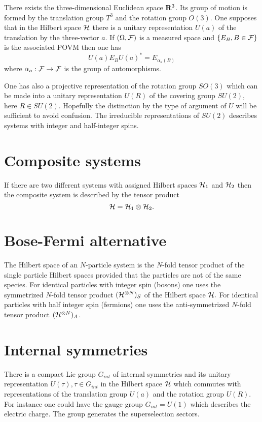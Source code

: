 \documentclass[12pt]{article}
\begin{document}
There exists the three-dimensional Euclidean space ${\bf R}^3$.
Its group of motion is formed by the translation group $T^3$ and
the rotation group $O(3)$. One supposes that in the Hilbert space
${\cal H}$ there is a unitary representation $U(a)$ of the
translation by the three-vector $a.$  If $(\Omega,{\cal F})$ is a
measured space and $\{E_B, B\in {\cal F}\}$ is the associated POVM
then one has
$$
U(a)E_BU(a)^*=E_{\alpha_a (B)}
$$
where $\alpha_a :{\cal F}\to {\cal F}$ is the group of
automorphisms.

One has also a projective representation of the rotation group
$SO(3)$ which can be made into a unitary representation $U(R)$ of
the covering group $SU(2)$, here $R\in SU(2).$ Hopefully the
distinction by the type of argument of $U$ will be sufficient to
avoid confusion. The irreducible representations of $SU(2)$
describes systems with integer and half-integer spins.


\section{Composite systems}

If there are two different systems with assigned Hilbert spaces
${\cal H}_1$ and ${\cal H}_2$ then the composite system is
described by the tensor product
$$
{\cal H}={\cal H}_1\otimes{\cal H}_2.
$$

\section{Bose-Fermi alternative}

The Hilbert space of an $N$-particle system is the $N$-fold tensor
product of the single particle Hilbert spaces provided that the
particles are not of the same species. For identical particles
with integer spin (bosons) one uses the symmetrized $N$-fold
tensor product $({\cal H}^{\otimes N})_S$  of the Hilbert space
${\cal H}.$ For identical particles with half integer spin
(fermions) one uses the anti-symmetrized $N$-fold tensor product
$({\cal H}^{\otimes N})_A$.

\section{Internal symmetries}

There is a compact Lie group $G_{int}$ of internal symmetries and
its unitary representation $U(\tau), \tau \in G_{int}$ in the
Hilbert space ${\cal H}$ which commutes with representations of
the translation group $U(a)$ and the rotation group $U(R).$ For
instance one could have the gauge group $G_{int}=U(1)$ which
describes the electric charge.
The group generates the superselection sectors.\\
\end{document}
